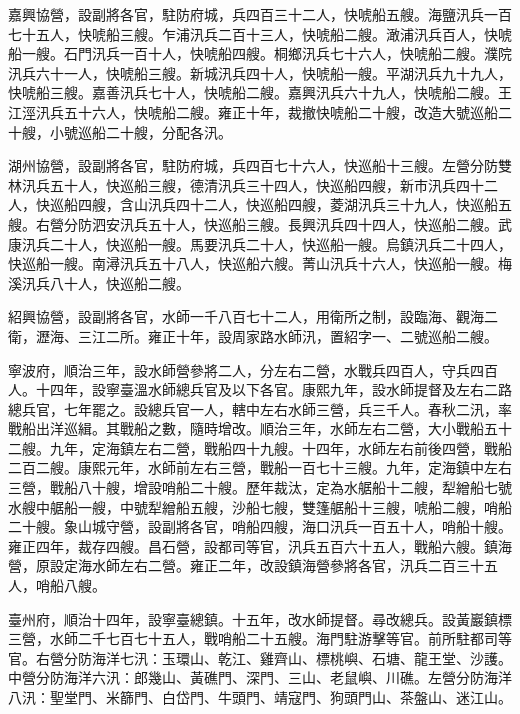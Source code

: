 \begin{pinyinscope}
嘉興協營，設副將各官，駐防府城，兵四百三十二人，快唬船五艘。海鹽汛兵一百七十五人，快唬船三艘。乍浦汛兵二百十三人，快唬船二艘。澉浦汛兵百人，快唬船一艘。石門汛兵一百十人，快唬船四艘。桐鄉汛兵七十六人，快唬船二艘。濮院汛兵六十一人，快唬船三艘。新城汛兵四十人，快唬船一艘。平湖汛兵九十九人，快唬船三艘。嘉善汛兵七十人，快唬船二艘。嘉興汛兵六十九人，快唬船二艘。王江涇汛兵五十六人，快唬船二艘。雍正十年，裁撤快唬船二十艘，改造大號巡船二十艘，小號巡船二十艘，分配各汛。

湖州協營，設副將各官，駐防府城，兵四百七十六人，快巡船十三艘。左營分防雙林汛兵五十人，快巡船三艘，德清汛兵三十四人，快巡船四艘，新市汛兵四十二人，快巡船四艘，含山汛兵四十二人，快巡船四艘，菱湖汛兵三十九人，快巡船五艘。右營分防泗安汛兵五十人，快巡船三艘。長興汛兵四十四人，快巡船二艘。武康汛兵二十人，快巡船一艘。馬要汛兵二十人，快巡船一艘。烏鎮汛兵二十四人，快巡船一艘。南潯汛兵五十八人，快巡船六艘。菁山汛兵十六人，快巡船一艘。梅溪汛兵八十人，快巡船二艘。

紹興協營，設副將各官，水師一千八百七十二人，用衛所之制，設臨海、觀海二衛，瀝海、三江二所。雍正十年，設周家路水師汛，置紹字一、二號巡船二艘。

寧波府，順治三年，設水師營參將二人，分左右二營，水戰兵四百人，守兵四百人。十四年，設寧臺溫水師總兵官及以下各官。康熙九年，設水師提督及左右二路總兵官，七年罷之。設總兵官一人，轄中左右水師三營，兵三千人。春秋二汛，率戰船出洋巡緝。其戰船之數，隨時增改。順治三年，水師左右二營，大小戰船五十二艘。九年，定海鎮左右二營，戰船四十九艘。十四年，水師左右前後四營，戰船二百二艘。康熙元年，水師前左右三營，戰船一百七十三艘。九年，定海鎮中左右三營，戰船八十艘，增設哨船二十艘。歷年裁汰，定為水艍船十二艘，犁繒船七號水艘中艍船一艘，中號犁繒船五艘，沙船七艘，雙篷艍船十三艘，唬船二艘，哨船二十艘。象山城守營，設副將各官，哨船四艘，海口汛兵一百五十人，哨船十艘。雍正四年，裁存四艘。昌石營，設都司等官，汛兵五百六十五人，戰船六艘。鎮海營，原設定海水師左右二營。雍正二年，改設鎮海營參將各官，汛兵二百三十五人，哨船八艘。

臺州府，順治十四年，設寧臺總鎮。十五年，改水師提督。尋改總兵。設黃巖鎮標三營，水師二千七百七十五人，戰哨船二十五艘。海門駐游擊等官。前所駐都司等官。右營分防海洋七汛：玉環山、乾江、雞齊山、標桃嶼、石塘、龍王堂、沙護。中營分防海洋六汛：郎幾山、黃礁門、深門、三山、老鼠嶼、川礁。左營分防海洋八汛：聖堂門、米篩門、白岱門、牛頭門、靖寇門、狗頭門山、茶盤山、迷江山。


\end{pinyinscope}
